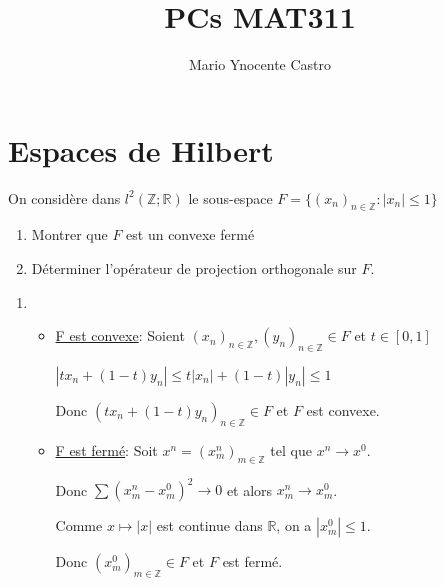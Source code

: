 \documentclass[10pt,a4paper,oneside]{article}
\newenvironment{exercice}[1][Exercice]{\begin{trivlist}
\item[\hskip \labelsep {\bfseries #1}]}{\end{trivlist}}
\newenvironment{solution}[1][Solution]{\begin{trivlist}
\item[\hskip \labelsep {\bfseries #1}]}{\end{trivlist}}
\begin{document}
\title{PCs MAT311}
\author{Mario Ynocente Castro}

\maketitle

\section{Espaces de Hilbert}

\begin{exercice}

On considère dans $l^2(\mathbb{Z};\mathbb{R})$ le sous-espace $F = \{ (x_n)_{n \in \mathbb{Z}} : |x_n| \leq 1 \}$

\begin{enumerate}

\item
Montrer que $F$ est un convexe fermé

\item
Déterminer l'opérateur de projection orthogonale sur $F$.

\end{enumerate}

\begin{solution}

\begin{enumerate}

\item

\begin{itemize}
\item
\underline{F est convexe}:
Soient $(x_n)_{n \in \mathbb{Z}}, (y_n)_{n \in \mathbb{Z}} \in F$ et $t \in [0,1]$

$| tx_n + (1 - t)y_n| \leq t |x_n| + (1-t) |y_n| \leq 1$

Donc $(t x_n + (1 - t) y_n )_{n \in \mathbb{Z}} \in F$ et $F$ est convexe.

\item
\underline{F est fermé}:
Soit $x^n = (x^n_m)_{m \in \mathbb{Z}}$ tel que $x^n \rightarrow x^0$.

Donc $\sum (x^n_m - x^0_m)^2 \rightarrow 0$ et alors $x^n_m \rightarrow x^0_m$.

Comme $x \mapsto |x|$ est continue dans $\mathbb{R}$, on a $|x^0_m| \leq 1$.

Donc $(x^0_m)_{m \in \mathbb{Z}} \in F$ et $F$ est fermé.

\end{itemize}


\end{enumerate}
\end{solution}
\end{exercice}
\end{document}
